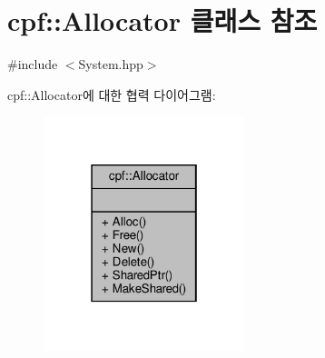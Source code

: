 \hypertarget{classcpf_1_1_allocator}{}\section{cpf\+:\+:Allocator 클래스 참조}
\label{classcpf_1_1_allocator}


{\ttfamily \#include $<$System.\+hpp$>$}



cpf\+:\+:Allocator에 대한 협력 다이어그램\+:
\nopagebreak
\begin{figure}[H]
\begin{center}
\leavevmode
\includegraphics[width=166pt]{classcpf_1_1_allocator__coll__graph}
\end{center}
\end{figure}
